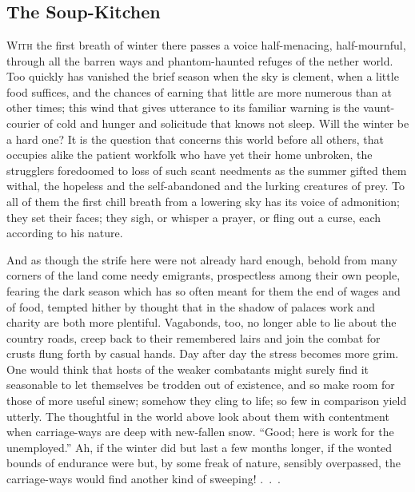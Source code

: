 \part{}

\chapter{The Soup-Kitchen}

\textsc{With} the first breath of winter there passes a voice
half-menacing, half-mournful, through all the barren ways and
phantom-haunted refuges of the nether world. Too quickly has vanished
the brief season when the sky is clement, when a little food suffices,
and the chances of earning that little are more numerous than at other
times; this wind that gives utterance to its familiar warning is the
vaunt-courier of cold and hunger and solicitude that knows not sleep.
Will the winter be a hard one? It is the question that concerns this
world before all others, that occupies alike the patient workfolk who
have yet their home unbroken, the strugglers foredoomed to loss of such
scant needments as the summer gifted {}them withal, the hopeless and the
self-abandoned and the lurking creatures of prey. To all of them the
first chill breath from a lowering sky has its voice of admonition; they
set their faces; they sigh, or whisper a prayer, or fling out a curse,
each according to his nature.

And as though the strife here were not already hard enough, behold from
many corners of the land come needy emigrants, prospectless among their
own people, fearing the dark season which has so often meant for them
the end of wages and of food, tempted hither by thought that in the
shadow of palaces work and charity are both more plentiful. Vagabonds,
too, no longer able to lie about the country roads, creep back to their
remembered lairs and join the combat for crusts flung forth by casual
hands. Day after day the stress becomes more grim. One would think that
hosts of the weaker combatants might surely find it seasonable to let
themselves be trodden out of existence, and so make room for those of
more useful sinew; somehow they cling to life; so few in comparison
yield utterly. The thoughtful in the world above look about them with
contentment when carriage-ways are deep {}with new-fallen snow. ``Good;
here is work for the unemployed.'' Ah, if the winter did but last a few
months longer, if the wonted bounds of endurance were but, by some freak
of nature, sensibly overpassed, the carriage-ways would find another
kind of {sweeping! {.~.~.}}

